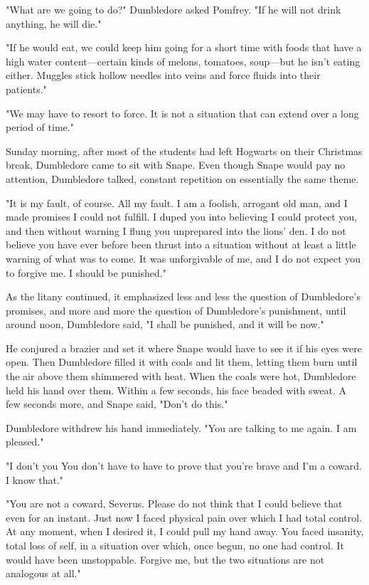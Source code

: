 "What are we going to do?" Dumbledore asked Pomfrey. "If he will not drink anything, he will die."

"If he would eat, we could keep him going for a short time with foods that have a high water content—certain kinds of melons, tomatoes, soup—but he isn't eating either. Muggles stick hollow needles into veins and force fluids into their patients."

"We may have to resort to force. It is not a situation that can extend over a long period of time."

Sunday morning, after most of the students had left Hogwarts on their Christmas break, Dumbledore came to sit with Snape. Even though Snape would pay no attention, Dumbledore talked, constant repetition on essentially the same theme.

"It is my fault, of course. All my fault. I am a foolish, arrogant old man, and I made promises I could not fulfill. I duped you into believing I could protect you, and then without warning I flung you unprepared into the lions' den. I do not believe you have ever before been thrust into a situation without at least a little warning of what was to come. It was unforgivable of me, and I do not expect you to forgive me. I should be punished."

As the litany continued, it emphasized less and less the question of Dumbledore's promises, and more and more the question of Dumbledore's punishment, until around noon, Dumbledore said, "I shall be punished, and it will be now."

He conjured a brazier and set it where Snape would have to see it if his eyes were open. Then Dumbledore filled it with coals and lit them, letting them burn until the air above them shimmered with heat. When the coals were hot, Dumbledore held his hand over them. Within a few seconds, his face beaded with sweat. A few seconds more, and Snape said, "Don't do this."

Dumbledore withdrew his hand immediately. "You are talking to me again. I am pleased."

"I don't{\el} you{\el} You don't have to have to prove that you're brave and I'm a coward. I know that."

"You are not a coward, Severus. Please do not think that I could believe that even for an instant. Just now I faced physical pain over which I had total control. At any moment, when I desired it, I could pull my hand away. You faced insanity, total loss of self, in a situation over which, once begun, no one had control. It would have been unstoppable. Forgive me, but the two situations are not analogous at all."

